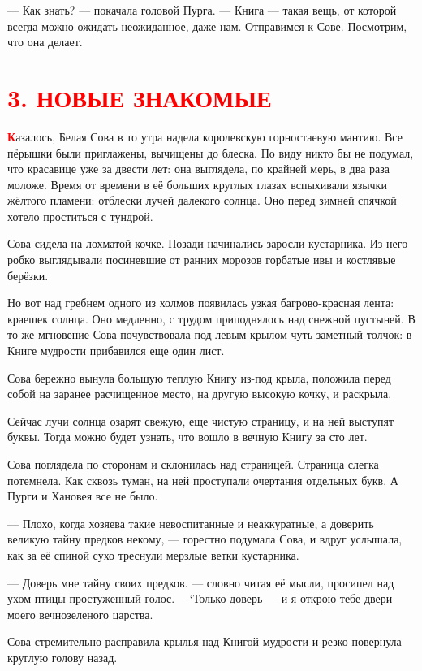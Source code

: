 \documentclass[12pt, a4paper, openany]{book}
\begin{document}
	— Как знать? — покачала головой Пурга. — Книга — такая вещь, от которой всегда можно ожидать неожиданное, даже нам. Отправимся к Сове. Посмотрим, что она делает.
	
		\section[3. Новые знакомые]{\center \textcolor{red}{3. НОВЫЕ ЗНАКОМЫЕ}}

	\lettrine[findent=0pt]{\textbf{\textcolor{red}{К}}}{}азалось, Белая Сова в то утра надела королевскую горностаевую мантию. Все пёрышки были приглажены, вычищены до блеска. По виду никто бы не подумал, что красавице уже за двести лет: она выглядела, по крайней мерь, в два раза моложе. Время от времени в её больших круглых глазах вспыхивали язычки жёлтого пламени: отблески лучей далекого солнца. Оно перед зимней спячкой хотело проститься с тундрой.
	
	Сова сидела на лохматой кочке. Позади начинались заросли кустарника. Из него робко выглядывали посиневшие от ранних морозов горбатые ивы и костлявые берёзки.
	
	Но вот над гребнем одного из холмов появилась узкая багрово-красная лента: краешек солнца. Оно медленно, с трудом приподнялось над снежной пустыней. В то же мгновение Сова почувствовала под левым крылом чуть заметный толчок: в Книге мудрости прибавился еще один лист.
	
	Сова бережно вынула большую теплую Книгу из-под крыла, положила перед собой на заранее расчищенное место, на другую высокую кочку, и раскрыла.
	
	Сейчас лучи солнца озарят свежую, еще чистую страницу, и на ней выступят буквы. Тогда можно будет узнать, что вошло в вечную Книгу за сто лет.
	
	Сова поглядела по сторонам и склонилась над страницей. Страница слегка потемнела. Как сквозь туман, на ней проступали очертания отдельных букв. А Пурги и Хановея все не было.
	
	— Плохо, когда хозяева такие невоспитанные и неаккуратные, а доверить великую тайну предков некому, — горестно подумала Сова, и вдруг услышала, как за её спиной сухо треснули мерзлые ветки кустарника.
	
	— Доверь мне тайну своих предков. — словно читая её мысли, просипел над ухом птицы простуженный голос.— ‘Только доверь — и я открою тебе двери моего вечнозеленого царства.
	
	Сова стремительно расправила крылья над Книгой мудрости и резко повернула круглую голову назад.
	
\end{document}
